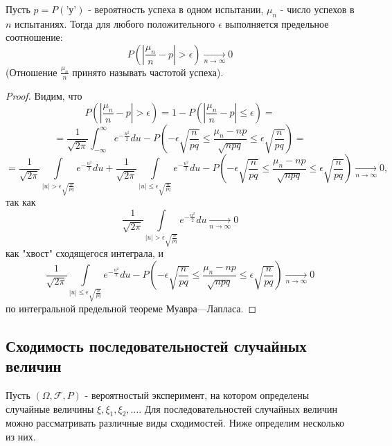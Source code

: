 \begin{theorem}
	Пусть $p = P(\text{'у'})$ - вероятность успеха в одном испытании, $\mu_n$ - число успехов в $n$ испытаниях. Тогда для любого положительного $\epsilon$ выполняется предельное соотношение:
	\[ P \left( \left| \frac{\mu_n}{n} - p \right| > \epsilon \right) \underset{n \to \infty}{\to} 0 \]
	(Отношение $\frac{\mu_n}{n}$ принято называть частотой успеха).
	\begin{proof}
		Видим, что
		\[ P \left( \left| \frac{\mu_n}{n} - p \right| > \epsilon \right) = 1 - P \left( \left| \frac{\mu_n}{n} - p \right| \le \epsilon \right) = \]
		\[ = \frac{1}{\sqrt{2 \pi}} \int_{- \infty}^{\infty} e^{-\frac{u^2}{2}} du - P \left( - \epsilon \sqrt{\frac{n}{pq}} \le \frac{\mu_n - np}{\sqrt{npq}} \le \epsilon \sqrt{\frac{n}{pq}} \right) = \]
		\[ = \frac{1}{\sqrt{2 \pi}} \int\limits_{|u| > \epsilon \sqrt{\frac{n}{pq}}} e^{-\frac{u^2}{2}} du + \frac{1}{\sqrt{2 \pi}} \int\limits_{|u| \le \epsilon \sqrt{\frac{n}{pq}}} e^{- \frac{u^2}{2}} du - P \left( - \epsilon \sqrt{\frac{n}{pq}} \le \frac{\mu_n - np}{\sqrt{npq}} \le \epsilon \sqrt{\frac{n}{pq}} \right) \underset{n \to \infty}{\to} 0, \]
		так как
		\[ \frac{1}{\sqrt{2 \pi}} \int\limits_{|u| > \epsilon \sqrt{\frac{n}{pq}}} e^{- \frac{u^2}{2}} du \underset{n \to \infty}{\to} 0 \]
		как "хвост" сходящегося интеграла, и
		\[ \frac{1}{\sqrt{2 \pi}} \int\limits_{|u| \le \epsilon \sqrt{\frac{n}{pq}}} e^{- \frac{u^2}{2}} du - P \left( - \epsilon \sqrt{\frac{n}{pq}} \le \frac{\mu_n - np}{\sqrt{npq}} \le \epsilon \sqrt{\frac{n}{pq}} \right) \underset{n \to \infty}{\to} 0 \]
		по интегральной предельной теореме Муавра—Лапласа.
	\end{proof}
\end{theorem}

\subsection{Сходимость последовательностей случайных величин}

Пусть $(\Omega, \mathcal{F}, P)$ - вероятностый эксперимент, на котором определены случайные величины $\xi, \xi_1, \xi_2, \dots$. Для последовательностей случайных величин можно рассматривать различные виды сходимостей. Ниже определим несколько из них.

